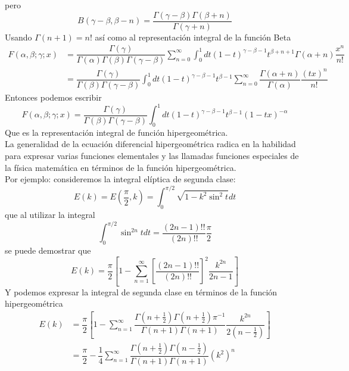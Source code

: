 pero
\[ B(\gamma - \beta, \beta -n) = \dfrac{\Gamma(\gamma - \beta) \Gamma(\beta + n)}{\Gamma(\gamma + n)} \]
Usando $\Gamma(n+1) = n!$ así como al representación integral de la función Beta
\[ \begin{split}
 F( \alpha, \beta; \gamma; x ) &= \dfrac{\Gamma(\gamma)}{\Gamma(\alpha) \Gamma(\beta) \Gamma(\gamma - \beta)}  \sum_{n=0}^{\infty} \int_{0}^{1} dt (1-t)^{\gamma - \beta -1} t^{\beta +n +1} \Gamma(\alpha + n) \dfrac{x^{n}}{n!} \\
&= \dfrac{\Gamma(\gamma)}{\Gamma(\beta) \Gamma(\gamma - \beta)} \int_{0}^{1} dt (1-t)^{\gamma - \beta -1} t^{\beta - 1} \sum_{n=0}^{\infty} \dfrac{\Gamma(\alpha + n)}{\Gamma(\alpha)} \dfrac{(tx)^{n}}{n!}
\end{split}  \]
Entonces podemos escribir
\begin{equation}
F( \alpha, \beta; \gamma; x ) = \dfrac{\Gamma(\gamma)}{\Gamma(\beta) \Gamma(\gamma - \beta)} \int_{0}^{1} dt (1-t)^{\gamma - \beta -1} t^{\beta - 1} (1-tx)^{-\alpha}
\label{eq:ecuacion_11_24}
\end{equation}
Que es la representación integral de función hipergeométrica.
\\
La generalidad de la ecuación diferencial hipergeométrica radica en la habilidad para expresar varias funciones elementales y las llamadas funciones especiales de la física matemática en términos de la función hipergeométrica.
\\
Por ejemplo: consideremos la integral elíptica de segunda clase:
\begin{equation}
E(k) = E \left( \dfrac{\pi}{2} ,k \right) = \int_{0}^{\pi/2} \sqrt{1-k^{2} \sin^{2} t} dt
\label{eq:ecuacion_11_15}
\end{equation}
que al utilizar la integral
\[ \int_{0}^{\pi/2} \sin^{2n} t dt = \dfrac{(2n-1)!!}{(2n)!!} \dfrac{\pi}{2} \]
se puede demostrar que
\[ E(k) = \dfrac{\pi}{2} \left[ 1 - \sum_{n=1}^{\infty} \left[ \dfrac{(2n-1)!!}{(2n)!!} \right]^{2} \dfrac{k^{2n}}{2n-1} \right] \]
Y podemos expresar la integral de segunda clase en términos de la función hipergeométrica
\[ \begin{split}
E(k) &= \dfrac{\pi}{2} \left[ 1 - \sum_{n=1}^{\infty} \dfrac{\Gamma(n+\frac{1}{2})\Gamma(n+\frac{1}{2}) \pi^{-1} }{\Gamma(n+1) \Gamma(n+1)} \dfrac{k^{2n}}{2(n - \frac{1}{2})} \right] \\
&= \dfrac{\pi}{2} - \dfrac{1}{4} \sum_{n=1}^{\infty} \dfrac{\Gamma(n+\frac{1}{2}) \Gamma(n-\frac{1}{2})}{\Gamma(n+1) \Gamma(n+1)} (k^{2})^{n}
\end{split} \]
